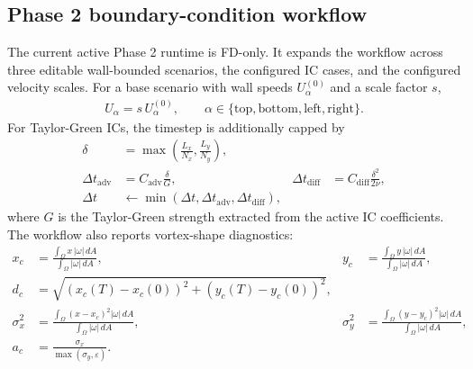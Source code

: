 \documentclass[11pt]{article}
\begin{document}
\subsection*{Phase 2 boundary-condition workflow}

The current active Phase 2 runtime is FD-only. It expands the workflow across three editable wall-bounded scenarios, the configured IC cases, and the configured velocity scales. For a base scenario with wall speeds $U_{\alpha}^{(0)}$ and a scale factor $s$,
\begin{align}
U_{\alpha} = s\,U_{\alpha}^{(0)},
\qquad
\alpha \in \{\mathrm{top},\mathrm{bottom},\mathrm{left},\mathrm{right}\}.
\end{align}
For Taylor-Green ICs, the timestep is additionally capped by
\begin{align}
\delta &= \max\!\left(\frac{L_x}{N_x}, \frac{L_y}{N_y}\right),
\\
\Delta t_{\mathrm{adv}} &= C_{\mathrm{adv}}\frac{\delta}{G},
&
\Delta t_{\mathrm{diff}} &= C_{\mathrm{diff}}\frac{\delta^2}{2\nu},
\\
\Delta t &\leftarrow
\min\!\left(\Delta t,\Delta t_{\mathrm{adv}},\Delta t_{\mathrm{diff}}\right),
\end{align}
where $G$ is the Taylor-Green strength extracted from the active IC coefficients. The workflow also reports vortex-shape diagnostics:
\begin{align}
x_c &= \frac{\int_{\Omega} x\,|\omega|\,dA}{\int_{\Omega} |\omega|\,dA},
&
y_c &= \frac{\int_{\Omega} y\,|\omega|\,dA}{\int_{\Omega} |\omega|\,dA},
\\
d_c &= \sqrt{\left(x_c(T)-x_c(0)\right)^2 + \left(y_c(T)-y_c(0)\right)^2},
\\
\sigma_x^2 &= \frac{\int_{\Omega} (x-x_c)^2 |\omega|\,dA}{\int_{\Omega} |\omega|\,dA},
&
\sigma_y^2 &= \frac{\int_{\Omega} (y-y_c)^2 |\omega|\,dA}{\int_{\Omega} |\omega|\,dA},
\\
a_c &= \frac{\sigma_x}{\max(\sigma_y,\varepsilon)}.
\end{align}
\end{document}
